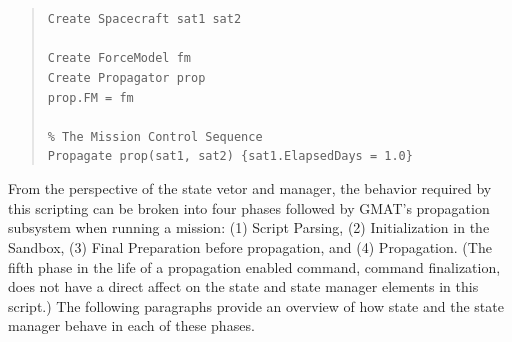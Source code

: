 \begin{quote}
\texttt{Create Spacecraft sat1 sat2\\
\\
Create ForceModel fm\\
Create Propagator prop\\
prop.FM = fm\\
\\
\% The Mission Control Sequence\\
Propagate prop(sat1, sat2) \{sat1.ElapsedDays = 1.0\}}
\end{quote}

\noindent From the perspective of the state vetor and manager, the behavior required by this
scripting can be broken into four phases followed by GMAT's propagation subsystem when running a
mission: (1) Script Parsing, (2) Initialization in the Sandbox, (3) Final Preparation before
propagation, and (4) Propagation.  (The fifth phase in the life of a propagation enabled
command, command finalization, does not have a direct affect on the state and state manager
elements in this script.)  The following paragraphs provide an overview of how state and the state
manager behave in each of these phases.

